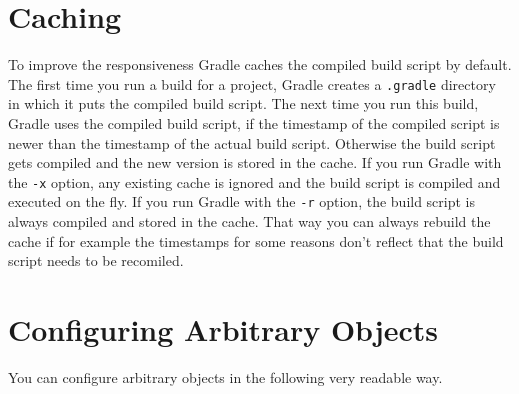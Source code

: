\section{Caching} %
\label{sec:caching}
To improve the responsiveness Gradle caches the compiled build script by default. The first time you run a build for a project, Gradle creates a \texttt{.gradle} directory in which it puts the compiled build script. The next time you run this build, Gradle uses the compiled build script, if the timestamp of the compiled script is newer than the timestamp of the actual build script. Otherwise the build script gets compiled and the new version is stored in the cache. If you run Gradle with the \texttt{-x} option, any existing cache is ignored and the build script is compiled and executed on the fly. If you run Gradle with the \texttt{-r} option, the build script is always compiled and stored in the cache. That way you can always rebuild the cache if for example the timestamps for some reasons don't reflect that the build script needs to be recomiled. 

\section{Configuring Arbitrary Objects} %
\label{sec:configuring_arbitrary_objects}
You can configure arbitrary objects in the following very readable way.


